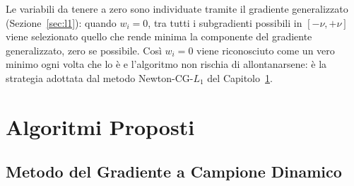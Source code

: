 \documentclass[a4paper,12pt]{article}
\numberwithin{equation}{section}
\numberwithin{figure}{section}
\numberwithin{table}{section}
\begin{document}
Le variabili da tenere a zero sono individuate tramite il gradiente
generalizzato (Sezione~\ref{sec:l1}): quando $w_i = 0$, tra tutti i
subgradienti possibili in $[-\nu,+\nu]$ viene selezionato quello che rende
minima la componente del gradiente generalizzato, zero se possibile. Così
$w_i = 0$ viene riconosciuto come un vero minimo ogni volta che lo è e
l'algoritmo non rischia di allontanarsene: è la strategia adottata dal metodo
Newton-CG-$L_1$ del Capitolo~\ref{sec:algoritmi}.

\section{Algoritmi Proposti}\label{sec:algoritmi}

\subsection{Metodo del Gradiente a Campione Dinamico}
\end{document}
